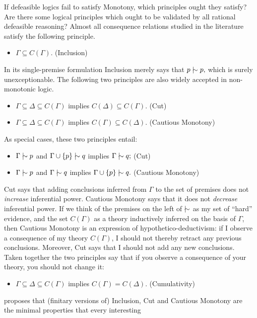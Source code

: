 If defeasible logics fail to satisfy Monotony, which principles ought they
satisfy? Are there some logical principles which ought to be validated by all
rational defeasible reasoning?  Almost all consequence relations studied in the
literature satisfy the following principle.
\begin{itemize}
\item[] $\Gamma \subseteq C(\Gamma).$ \hfill(Inclusion)
\end{itemize}
In its single-premise formulation Inclusion merely says that $p\mathrel{\mid\hspace{-.08em}\!\sim} p,$ which is
surely unexceptionable. The following two principles are also widely accepted in
non-monotonic logic.
\begin{itemize}
\item[] $\Gamma \subseteq \Delta \subseteq C(\Gamma)$ implies
$C(\Delta)\subseteq C(\Gamma)$. \hfill (Cut)
\item[] $\Gamma \subseteq \Delta \subseteq C(\Gamma)$ implies
$C(\Gamma)\subseteq C(\Delta)$. \hfill(Cautious Monotony) 
\end{itemize}
As special cases, these two principles entail:
\begin{itemize}
\item[] $\Gamma \mathrel{\mid\hspace{-.08em}\!\sim} p$ and $\Gamma \cup \{p\} \mathrel{\mid\hspace{-.08em}\!\sim} q$ implies $\Gamma \mathrel{\mid\hspace{-.08em}\!\sim} q;$
\hfill (Cut)
\item[] $\Gamma \mathrel{\mid\hspace{-.08em}\!\sim} p$ and $\Gamma \mathrel{\mid\hspace{-.08em}\!\sim} q$ implies $\Gamma \cup \{p\} \mathrel{\mid\hspace{-.08em}\!\sim} q.$
\hfill (Cautious Monotony)
\end{itemize}
Cut says that adding conclusions inferred from $\Gamma$ to the set of premises
does not {\em increase} inferential power. Cautious Monotony says that it does
not {\em decrease} inferential power. If we think of the premises on the left of
$\mathrel{\mid\hspace{-.08em}\!\sim}$ as my set of ``hard'' evidence, and the set $C(\Gamma)$ as a theory
inductively inferred on the basis of $\Gamma$, then Cautious Monotony is an
expression of hypothetico-deductivism: if I observe a consequence of my theory
$C(\Gamma)$, I should not thereby retract any previous conclusions. Moreover,
Cut says that I should not add any new conclusions. Taken together the two
principles say that if you observe a consequence of your theory, you should not
change it:
\begin{itemize}
\item[] $\Gamma \subseteq \Delta \subseteq C(\Gamma)$ implies
$C(\Gamma)=C(\Delta).$ \hfill (Cumulativity)
\end{itemize}
\citet{gabbay1985theoretical} proposes that (finitary versions of) Inclusion,
Cut and Cautious Monotony are the minimal properties that every interesting
